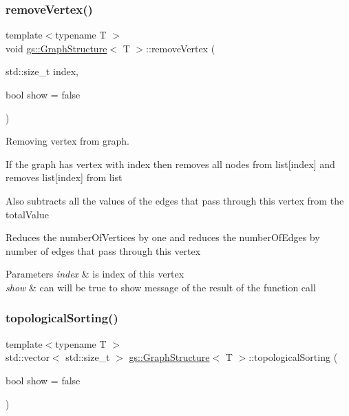 \subsubsection{\texorpdfstring{remove\+Vertex()}{removeVertex()}}
{\footnotesize\ttfamily template$<$typename T $>$ \\
void \mbox{\hyperlink{classgs_1_1_graph_structure}{gs\+::\+Graph\+Structure}}$<$ T $>$\+::remove\+Vertex (\begin{DoxyParamCaption}\item[{std\+::size\+\_\+t}]{index,  }\item[{bool}]{show = {\ttfamily false} }\end{DoxyParamCaption})}



Removing vertex from graph. 

If the graph has vertex with \textquotesingle{}index\textquotesingle{} then removes all nodes from \textquotesingle{}list\mbox{[}index\mbox{]}\textquotesingle{} and removes \textquotesingle{}list\mbox{[}index\mbox{]}\textquotesingle{} from \textquotesingle{}list\textquotesingle{}

Also subtracts all the values of the edges that pass through this vertex from the \textquotesingle{}total\+Value\textquotesingle{}

Reduces the \textquotesingle{}number\+Of\+Vertices\textquotesingle{} by one and reduces the \textquotesingle{}number\+Of\+Edges\textquotesingle{} by number of edges that pass through this vertex 
\begin{DoxyParams}{Parameters}
{\em index} & is index of this vertex \\
\hline
{\em show} & can will be true to show message of the result of the function call \\
\hline
\end{DoxyParams}
\mbox{\label{classgs_1_1_graph_structure_aaaccde89d753affe1ca96ad3a25a03b0}} 
\subsubsection{\texorpdfstring{topological\+Sorting()}{topologicalSorting()}}
{\footnotesize\ttfamily template$<$typename T $>$ \\
std\+::vector$<$ std\+::size\+\_\+t $>$ \mbox{\hyperlink{classgs_1_1_graph_structure}{gs\+::\+Graph\+Structure}}$<$ T $>$\+::topological\+Sorting (\begin{DoxyParamCaption}\item[{bool}]{show = {\ttfamily false} }\end{DoxyParamCaption})}



